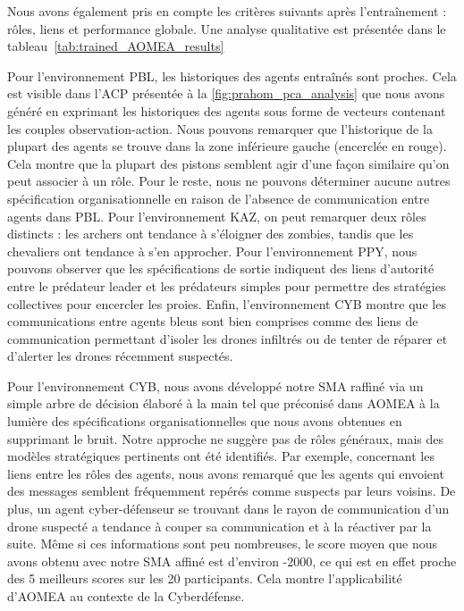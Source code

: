\documentclass[contribution]{jfsma}
\begin{document}
Nous avons également pris en compte les critères suivants après l'entraînement : rôles, liens et performance globale. Une analyse qualitative est présentée dans le tableau~\ref{tab:trained_AOMEA_results}
%

%
%
Pour l'environnement PBL, les historiques des agents entraînés sont proches. Cela est visible dans l'ACP présentée à la \autoref{fig:prahom_pca_analysis} que nous avons généré en exprimant les historiques des agents sous forme de vecteurs contenant les couples observation-action. Nous pouvons remarquer que l'historique de la plupart des agents se trouve dans la zone inférieure gauche (encerclée en rouge). Cela montre que la plupart des pistons semblent agir d'une façon similaire qu'on peut associer à un rôle. Pour le reste, nous ne pouvons déterminer aucune autres spécification organisationnelle en raison de l'absence de communication entre agents dans PBL. Pour l'environnement KAZ, on peut remarquer deux rôles distincts : les archers ont tendance à s'éloigner des zombies, tandis que les chevaliers ont tendance à s'en approcher. Pour l'environnement PPY, nous pouvons observer que les spécifications de sortie indiquent des liens d'autorité entre le prédateur leader et les prédateurs simples pour permettre des stratégies collectives pour encercler les proies. Enfin, l’environnement CYB montre que les communications entre agents bleus sont bien comprises comme des liens de communication permettant d’isoler les drones infiltrés ou de tenter de réparer et d’alerter les drones récemment suspectés.

Pour l'environnement CYB, nous avons développé notre SMA raffiné via un simple arbre de décision élaboré à la main tel que préconisé dans AOMEA à la lumière des spécifications organisationnelles que nous avons obtenues en supprimant le bruit. Notre approche ne suggère pas de rôles généraux, mais des modèles stratégiques pertinents ont été identifiés. Par exemple, concernant les liens entre les rôles des agents, nous avons remarqué que les agents qui envoient des messages semblent fréquemment repérés comme suspects par leurs voisins. De plus, un agent cyber-défenseur se trouvant dans le rayon de communication d’un drone suspecté a tendance à couper sa communication et à la réactiver par la suite. Même si ces informations sont peu nombreuses, le score moyen que nous avons obtenu avec notre SMA affiné est d'environ -2000, ce qui est en effet proche des 5 meilleurs scores sur les 20 participants. Cela montre l'applicabilité d'AOMEA au contexte de la Cyberdéfense.
\end{document}
